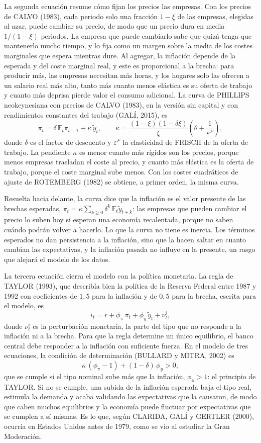 \documentclass[10pt,a4paper]{article}
\begin{document}
La segunda ecuación resume cómo fijan los precios las empresas. Con los precios de CALVO (1983), cada periodo solo una fracción $1-\xi$ de las empresas, elegidas al azar, puede cambiar su precio, de modo que un precio dura en media $1/(1-\xi)$ periodos. La empresa que puede cambiarlo sabe que quizá tenga que mantenerlo mucho tiempo, y lo fija como un margen sobre la media de los costes marginales que espera mientras dure. Al agregar, la inflación depende de la esperada y del coste marginal real, y este es proporcional a la brecha: para producir más, las empresas necesitan más horas, y los hogares solo las ofrecen a un salario real más alto, tanto más cuanto menos elástica es su oferta de trabajo y cuanto más deprisa pierde valor el consumo adicional. La curva de PHILLIPS neokeynesiana con precios de CALVO (1983), en la versión sin capital y con rendimientos constantes del trabajo (GALÍ, 2015), es
$$\pi_t=\delta\,\mathbb{E}_t\pi_{t+1}+\kappa\,\tilde y_t,\qquad \kappa=\frac{(1-\xi)(1-\delta\xi)}{\xi}\left(\theta+\frac{1}{\varepsilon^F}\right),$$
donde $\delta$ es el factor de descuento y $\varepsilon^F$ la elasticidad de FRISCH de la oferta de trabajo. La pendiente $\kappa$ es menor cuanto más rígidos son los precios, porque menos empresas trasladan el coste al precio, y cuanto más elástica es la oferta de trabajo, porque el coste marginal sube menos. Con los costes cuadráticos de ajuste de ROTEMBERG (1982) se obtiene, a primer orden, la misma curva.

Resuelta hacia delante, la curva dice que la inflación es el valor presente de las brechas esperadas, $\pi_t=\kappa\sum_{k\ge0}\delta^k\,\mathbb{E}_t\tilde y_{t+k}$: las empresas que pueden cambiar el precio lo suben hoy si esperan una economía recalentada, porque no saben cuándo podrán volver a hacerlo. Lo que la curva no tiene es inercia. Los términos esperados no dan persistencia a la inflación, sino que la hacen saltar en cuanto cambian las expectativas, y la inflación pasada no influye en la presente, un rasgo que alejará el modelo de los datos.

La tercera ecuación cierra el modelo con la política monetaria. La regla de TAYLOR (1993), que describía bien la política de la Reserva Federal entre 1987 y 1992 con coeficientes de $1{,}5$ para la inflación y de $0{,}5$ para la brecha, escrita para el modelo, es
$$i_t=\bar r+\phi_\pi\,\pi_t+\phi_y\,\tilde y_t+\nu^i_t,$$
donde $\nu^i_t$ es la perturbación monetaria, la parte del tipo que no responde a la inflación ni a la brecha. Para que la regla determine un único equilibrio, el banco central debe responder a la inflación con suficiente fuerza. En el modelo de tres ecuaciones, la condición de determinación (BULLARD y MITRA, 2002) es
$$\kappa\,(\phi_\pi-1)+(1-\delta)\,\phi_y>0,$$
que se cumple si el tipo nominal sube más que la inflación, $\phi_\pi>1$: el principio de TAYLOR. Si no se cumple, una subida de la inflación esperada baja el tipo real, estimula la demanda y acaba validando las expectativas que la causaron, de modo que caben muchos equilibrios y la economía puede fluctuar por expectativas que se cumplen a sí mismas. Es lo que, según CLARIDA, GALÍ y GERTLER (2000), ocurría en Estados Unidos antes de 1979, como se vio al estudiar la Gran Moderación.
\end{document}
